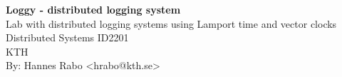 \begin{titlepage}
	\thispagestyle{empty}
	
	\begin{center}
	  \vspace*{5cm}
	  
	  \huge{\textbf{Loggy - distributed logging system}}\\
	  \vspace{.5cm}
	  \Large{Lab with distributed logging systems using Lamport time and vector clocks}\\
	  \vspace{2.5cm}
	  \normalsize Distributed Systems ID2201\\
	  \vspace{2mm}		
	  \Large{KTH}\\
	  \vspace{6.5cm} 
	  \normalsize By: Hannes Rabo <hrabo@kth.se>
	\end{center} 
	
\end{titlepage}